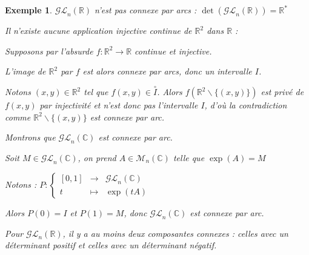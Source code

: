 \documentclass[a4paper,12pt]{book}
\newtheorem{Exe}{Exemple}[section]
\def\R{\mathbb{R}}
\def\C{\mathbb{C}}
\begin{document}
\begin{Exe}
$\mathcal{GL}_n(\R)$ n'est pas connexe par arcs : $\det(\mathcal{GL}_n(\R))=\R^*$ \par Il n'existe aucune application injective continue de $\R^2$ dans $\R$ : \par Supposons par l'absurde $f:\R^2\to \R$ continue et injective. \par L'image de $\R^2$ par $f$ est alors connexe par arcs, donc un intervalle $I$. \par Notons $(x,y)\in \R^2$ tel que $f(x,y)\in\overset{\circ}{I}$. Alors $f(\R^2 \backslash \{(x,y)\})$ est privé de $f(x,y)$ par injectivité et n'est donc pas l'intervalle $I$, d'où la contradiction comme $\R^2\backslash\{(x,y)\}$ est connexe par arc.
\par Montrons que $\mathcal{GL}_n(\C)$ est connexe par arc. \par Soit $M\in\mathcal{GL}_n(\C)$, on prend $A\in\mathcal{M}_n(\C)$ telle que $\exp(A)=M$ \par Notons : $P :\left\{\begin{array}{rcl} [0,1] & \to & \mathcal{GL}_n(\C) \\ t & \mapsto & \exp(tA) \end{array}\right.$ \par Alors $P(0)=I$ et $P(1)=M$, donc $\mathcal{GL}_n(\C)$ est connexe par arc. \par Pour $\mathcal{GL}_n(\R)$, il y a au moins deux composantes connexes : celles avec un déterminant positif et celles avec un déterminant négatif.
\end{Exe}
\end{document}
